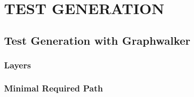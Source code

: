 \chapter{TEST GENERATION}
\label{chapter:test_generation}

\section{Test Generation with Graphwalker}
\subsection{Layers}
\subsection{Minimal Required Path}